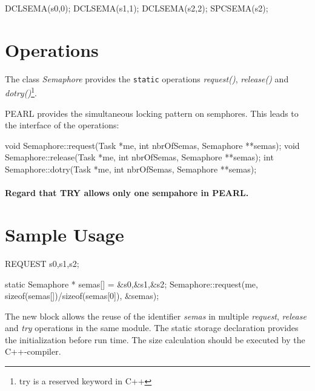 \begin{CppCode}
DCLSEMA(s0,0);
DCLSEMA(s1,1);
DCLSEMA(s2,2);
SPCSEMA(s2);
\end{CppCode}

\section{Operations}
The class {\em Semaphore} provides the \verb|static| operations 
{\em request()}, {\em release()} and {\em dotry()}\footnote{try is a reserved
keyword in C++}.

PEARL provides the simultaneous locking pattern on semphores.
This leads to the interface of the operations:
\begin{CppCode}
void Semaphore::request(Task *me, int nbrOfSemas, Semaphore **semas);
void Semaphore::release(Task *me, int nbrOfSemas, Semaphore **semas);
int Semaphore::dotry(Task *me, int nbrOfSemas, Semaphore **semas);
\end{CppCode}

\paragraph{Regard that TRY allows only one sempahore in PEARL.}

\section{Sample Usage}

\begin{PEARLCode}
REQUEST s0,s1,s2;
\end{PEARLCode}

\begin{CppCode}
{
   static Semaphore * semas[] = {&s0,&s1,&s2};
   Semaphore::request(me, sizeof(semas[])/sizeof(semas[0]), &semas);
}
\end{CppCode}

The new block allows the reuse of the identifier {\em semas} in multiple
{\em request}, {\em release} and {\em try} operations in the same 
module.
The static storage declaration provides the initialization before run time.
The size calculation should be executed by the C++-compiler.
